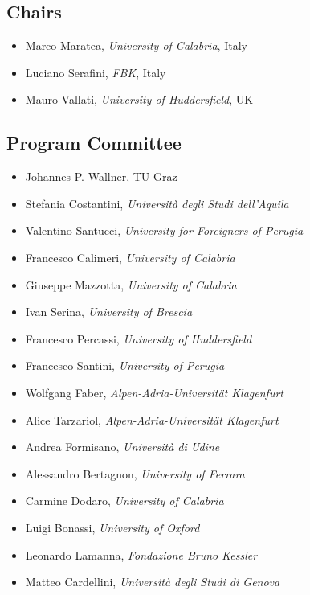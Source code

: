 \documentclass[
]{ceurart}
\begin{document}

\subsection*{Chairs}
\begin{itemize}
  \item Marco Maratea, \emph{University of Calabria}, Italy
  \item Luciano Serafini, \emph{FBK}, Italy
  \item Mauro Vallati, \emph{University of Huddersfield}, UK
\end{itemize}


\subsection*{Program Committee}
\begin{itemize}
  \item Johannes P. Wallner, TU Graz
  \item Stefania Costantini, \emph{Università degli Studi dell'Aquila}
  \item Valentino Santucci, \emph{University for Foreigners of Perugia}
  \item Francesco Calimeri, \emph{University of Calabria}
  \item Giuseppe Mazzotta, \emph{University of Calabria}
  \item Ivan Serina, \emph{University of Brescia}
  \item Francesco Percassi, \emph{University of Huddersfield}
  \item Francesco Santini, \emph{University of Perugia}
  \item Wolfgang Faber, \emph{Alpen-Adria-Universität Klagenfurt}
  \item Alice Tarzariol, \emph{Alpen-Adria-Universität Klagenfurt}
  \item Andrea Formisano, \emph{Università di Udine}
  \item Alessandro Bertagnon, \emph{University of Ferrara}
  \item Carmine Dodaro, \emph{University of Calabria}
  \item Luigi Bonassi, \emph{University of Oxford}
  \item Leonardo Lamanna, \emph{Fondazione Bruno Kessler}
  \item Matteo Cardellini, \emph{Università degli Studi di Genova}
\end{itemize}
\end{document}
